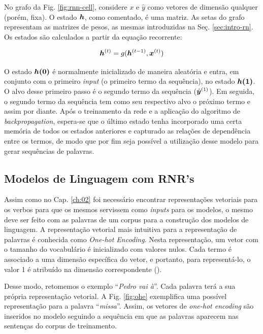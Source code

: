 No grafo da Fig. \ref{fig:rnn-cell}, considere $x$ e $\hat{y}$ como vetores de dimensão qualquer (porém, fixa). O estado $\bm{h}$, como comentado, é uma matriz. As setas do grafo representam as matrizes de pesos, as mesmas introduzidas na Seç. \ref{sec:intro-rn}.
Os estados são calculados a partir da equação recorrente:

\begin{equation}
\bm{h}^{(t)} = g(\bm{h}^{(t-1)}, \bm{x}^{(t)})
\label{eq:rnn}
\end{equation}


O estado $\bm{h(0)}$ é normalmente inicializado de maneira aleatória e entra, em conjunto com o primeiro \textit{input} (o primeiro termo da sequência), no estado $\bm{h(1)}$. O alvo desse primeiro passo é o segundo termo da sequência ($\hat{\bm{y}}^{(1)}$). Em seguida, o segundo termo da sequência tem como seu respectivo alvo o próximo termo e assim por diante. Após o treinamento da rede e a aplicação do algoritmo de \textit{backpropagation}, espera-se que o último estado tenha incorporado uma certa memória de todos os estados anteriores e capturado as relações de dependência entre os termos, de modo que por fim seja possível a utilização desse modelo para gerar sequências de palavras. 

\subsection{Modelos de Linguagem com RNR's}

Assim como no Cap. \ref{ch:02} foi necessário encontrar representações vetoriais para os verbos para que os mesmos servissem como \textit{inputs} para os modelos, o mesmo deve ser feito com as palavras de um corpus para a construção dos modelos de linguagem. A representação vetorial mais intuitiva para a representação de palavras é conhecida como \textit{One-hot Encoding}. Nesta representação, um vetor com o tamanho do vocabulário é inicializado com valores nulos. Cada termo é associado a uma dimensão específica do vetor, e portanto, para representá-lo, o valor 1 é atribuído na dimensão correspondente (\cite{harris:2013}). 

Desse modo, retomemos o exemplo “\textit{Pedro vai à}”. Cada palavra terá a sua própria representação vetorial. A Fig. \ref{fig:ohe} exemplifica uma possível representação para a palavra “\textit{missa}”. Assim, os vetores de \textit{one-hot encoding} são inseridos no modelo seguindo a sequência em que as palavras aparecem nas sentenças do corpus de treinamento. 

